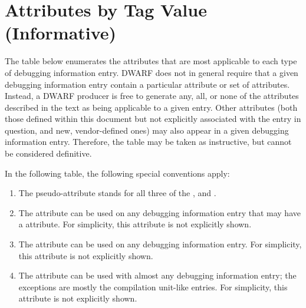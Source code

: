 \chapter[Attributes by Tag (Informative)]{Attributes by Tag Value (Informative)}
\label{chap:attributesbytagvalueinformative}

The table below enumerates the attributes that are
most applicable to each type of debugging information
entry. DWARF does not in general require that a given
debugging information entry contain a particular attribute
or set of attributes. Instead, a DWARF producer is free to
generate any, all, or none of the attributes described in the
text as being applicable to a given entry. Other attributes
(both those defined within this document but not explicitly
associated with the entry in question, and new, vendor-defined
ones) may also appear in a given debugging information
entry. Therefore, the table may be taken as instructive, but
cannot be considered definitive.  

In the following table, the following special conventions apply:
\begin{enumerate}[1. ]

\item The 
pseudo-attribute stands for all three of the
\DWATdeclcolumn,
\DWATdeclfile{} and 
\DWATdeclline.

\item The \DWATdescription{} attribute can be used on any
debugging information entry that may have a \DWATname{} attribute.
For simplicity, this attribute is not explicitly shown.

\item The \DWATsibling{} attribute can be used on any 
debugging information entry. 
For simplicity, this attribute is not explicitly shown.

\item The \DWATabstractorigin{} attribute can be used with
almost any debugging information entry; 
the exceptions are mostly the compilation
unit-like entries. 
For simplicity, this attribute is not explicitly shown. 

\end{enumerate}

\small

